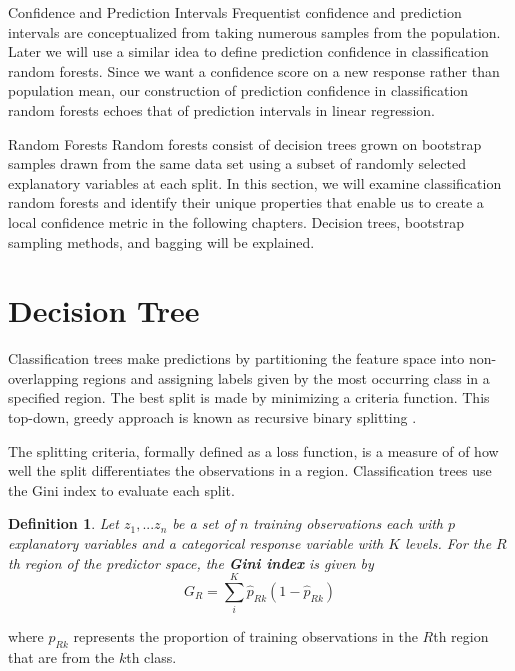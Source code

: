 \documentclass[12pt]{pom_thesis}
\newtheorem{definition}{Definition}[section]
\begin{document}
\begin{chapter}{Confidence and Prediction Intervals}
Frequentist confidence and prediction intervals are conceptualized from taking numerous samples from the population. Later we will use a similar idea to define prediction confidence in classification random forests. Since we want a confidence score on a new response rather than population mean, our construction of prediction confidence in classification random forests echoes that of prediction intervals in linear regression.  
\end{chapter}

\begin{chapter}{Random Forests}
Random forests consist of decision trees grown on bootstrap samples drawn from the same data set using a subset of randomly selected explanatory variables at each split. In this section, we will examine classification random forests and identify their unique properties that enable us to create a local confidence metric in the following chapters. Decision trees, bootstrap sampling methods, and bagging will be explained.

\section{Decision Tree}
Classification trees make predictions by partitioning the feature space into non-overlapping regions and assigning labels given by the most occurring class in a specified region. The best split is made by minimizing a criteria function. This top-down, greedy approach is known as recursive binary splitting \citep{ISLR}.

The splitting criteria, formally defined as a loss function, is a measure of of how well the split differentiates the observations in a region. Classification trees use the Gini index to evaluate each split.


\begin{definition}
Let $z_1,...z_n$ be a set of $n$ training observations each with $p$ explanatory variables and a categorical response variable with $K$ levels. For the $R$th region of the predictor space, the \textbf{Gini index} is given by
$$G_R= \sum_i^K \hat{p}_{Rk}(1-\hat{p}_{Rk})$$
\end{definition}
where $\hat{p}_{Rk}$ represents the proportion of training observations in the $R$th region that are from the $k$th class.


\end{chapter}
\end{document}
